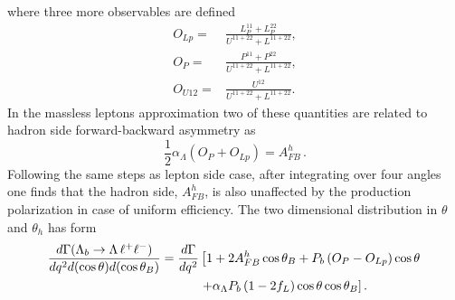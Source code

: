 where three more observables are defined
\begin{align}
O_{Lp}=&\frac{L_P^{11}+L_P^{22}}{U^{11+22}+L^{11+22}}, \nonumber \\
O_P=&\frac{P^{11}+P^{22}}{U^{11+22}+L^{11+22}}, \nonumber \\
O_{U12}=&\frac{U^{12}}{U^{11+22}+L^{11+22}}. \nonumber
\end{align}
%
In the massless leptons approximation two of these quantities are related to hadron side
forward-backward asymmetry as
\begin{equation}
\frac{1}{2}\alpha_\Lambda \left(O_P+O_{Lp}\right)=A_{FB}^h\,.
\end{equation}
%
Following the same steps as lepton side case, after integrating over four angles one finds that
the hadron side, $A_{FB}^h$, is also unaffected by the production polarization in case of uniform
efficiency. The two dimensional distribution in $\theta$ and $\theta_h$ has form
\begin{align}
\frac{d\Gamma(\Lambda_{b}\rightarrow \Lambda \,\ell^{+}\ell^{-})}{dq^2d(\cos\theta) d(\cos\theta_B)}=
\frac{d\Gamma}{dq^2}&\left[1+2A_{FB}^h\cos\theta_B+P_b\left(O_P-O_{Lp}\right)\cos\theta\right.\nonumber \\
&\left.+\alpha_\Lambda P_b\left(1-2f_L\right)\cos\theta\cos\theta_B\right].
\label{eq:hadron2D}
\end{align}

